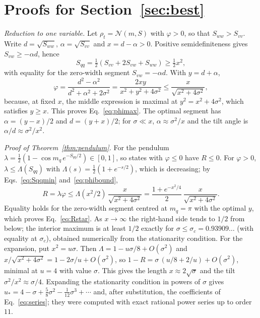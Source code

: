 \section{Proofs for Section~\ref{sec:best}}
\label{app:best}

\emph{Reduction to one variable.} Let $\rho_t = \mathcal N(m,S)$ with $\varphi > 0$, so that $S_{ww} > S_{vv}$. Write $d = \sqrt{S_{ww}}$, $\alpha = \sqrt{S_{vv}}$ and $x = d - \alpha > 0$. Positive semidefiniteness gives $S_{vw} \geq -\alpha d$, hence
\begin{equation}
S_{qq} = \tfrac12\left(S_{vv} + 2S_{vw} + S_{ww}\right) \geq \tfrac12 x^2 ,
\label{eq:Sqqmin}
\end{equation}
with equality for the zero-width segment $S_{vw} = -\alpha d$. With $y = d + \alpha$,
\begin{equation}
\varphi = \frac{d^2 - \alpha^2}{d^2 + \alpha^2 + 2\sigma^2} = \frac{2xy}{x^2 + y^2 + 4\sigma^2}
\leq \frac{x}{\sqrt{x^2 + 4\sigma^2}} ,
\label{eq:phibound}
\end{equation}
because, at fixed $x$, the middle expression is maximal at $y^2 = x^2 + 4\sigma^2$, which satisfies $y \geq x$. This proves Eq.~\eqref{eq:phimax}. The optimal segment has $\alpha = (y - x)/2$ and $d = (y + x)/2$; for $\sigma \ll x$, $\alpha \approx \sigma^2/x$ and the tilt angle is $\alpha/d \approx \sigma^2/x^2$.

\emph{Proof of Theorem~\ref{thm:pendulum}.} For the pendulum $\lambda = \tfrac12\left(1 - \cos m_q\,e^{-S_{qq}/2}\right) \in [0,1]$, so states with $\varphi \leq 0$ have $R \leq 0$. For $\varphi > 0$, $\lambda \leq \Lambda(S_{qq})$ with $\Lambda(s) = \tfrac12(1 + e^{-s/2})$, which is decreasing; by Eqs.~\eqref{eq:Sqqmin} and~\eqref{eq:phibound},
\begin{equation*}
R = \lambda\varphi \leq \Lambda(x^2/2)\,\frac{x}{\sqrt{x^2 + 4\sigma^2}} = \frac{1 + e^{-x^2/4}}{2}\,\frac{x}{\sqrt{x^2 + 4\sigma^2}} .
\end{equation*}
Equality holds for the zero-width segment centred at $m_q = \pi$ with the optimal $y$, which proves Eq.~\eqref{eq:Rstar}. As $x \to \infty$ the right-hand side tends to $1/2$ from below; the interior maximum is at least $1/2$ exactly for $\sigma \leq \sigma_c = 0.93909\ldots$ (with equality at $\sigma_c$), obtained numerically from the stationarity condition. For the expansion, put $x^2 = u\sigma$. Then $\Lambda = 1 - u\sigma/8 + O(\sigma^2)$ and $x/\sqrt{x^2 + 4\sigma^2} = 1 - 2\sigma/u + O(\sigma^2)$, so $1 - R = \sigma\,(u/8 + 2/u) + O(\sigma^2)$, minimal at $u = 4$ with value $\sigma$. This gives the length $x \approx 2\sqrt\sigma$ and the tilt $\sigma^2/x^2 \approx \sigma/4$. Expanding the stationarity condition in powers of $\sigma$ gives $u_* = 4 - \sigma + \tfrac58\sigma^2 - \tfrac1{12}\sigma^3 + \cdots$ and, after substitution, the coefficients of Eq.~\eqref{eq:series}; they were computed with exact rational power series up to order $11$.

